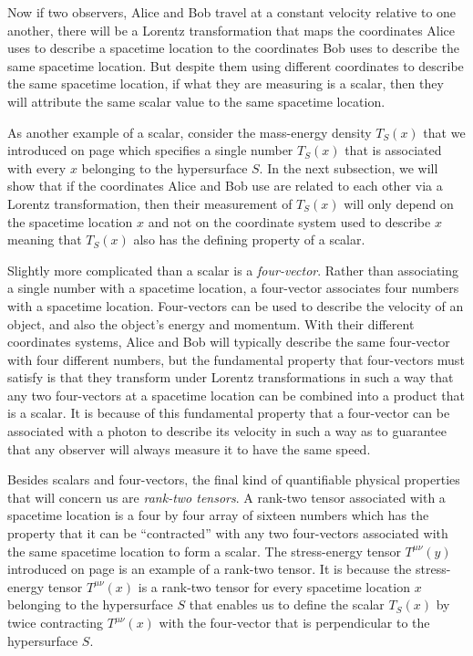 \documentclass[12pt]{report}
\begin{document}
Now if two observers, Alice and Bob travel at a constant velocity relative to one another, there will be a Lorentz transformation that maps the coordinates Alice uses to describe a spacetime location to the coordinates  Bob uses to describe the same spacetime location.  But despite them using different coordinates to describe the same spacetime location, if what they are measuring is a scalar, then they will attribute the same scalar value to the same spacetime location.

As another example of a scalar, consider the mass-energy density $T_S(x)$ that we introduced on page \pageref{massenergydensity} which specifies a single number $T_S(x)$ that is associated with every $x$ belonging to the hypersurface $S$. In the next subsection, we will show that if the coordinates Alice and Bob use are related to each other via a Lorentz transformation, then their measurement of $T_S(x)$ will only depend on the spacetime location $x$ and not on the coordinate system used to describe $x$ meaning that $T_S(x)$ also has the defining property of a scalar.

Slightly more complicated than a scalar is a \emph{four-vector}. Rather than associating a single number with a spacetime location, a four-vector associates four numbers with a spacetime location. Four-vectors can be used to describe the velocity of an object, and also the object's energy and momentum. With their different coordinates systems, Alice and Bob will typically describe the same four-vector with four different numbers, but the fundamental property that four-vectors must satisfy is that they transform under Lorentz transformations in such a way that any two four-vectors at a spacetime location can be combined into a product that is a scalar. It is because of this fundamental property that a four-vector can be associated with a photon to describe its velocity in such a way as to guarantee that any observer will always measure it to have the same speed.

Besides scalars and four-vectors, the final kind of quantifiable physical properties that will concern us are \emph{rank-two tensors}. A rank-two tensor associated with a spacetime location is a four by four array of sixteen numbers which has the property that it can be ``contracted'' with any two four-vectors associated with the same spacetime location to form a scalar. The stress-energy tensor $T^{\mu\nu}(y)$ introduced on page \pageref{stressenergy} is an example of a rank-two tensor. It is because the stress-energy tensor $T^{\mu\nu}(x)$ is a rank-two tensor for every spacetime location $x$ belonging to the hypersurface $S$ that enables us to define the scalar $T_S(x)$ by twice contracting $T^{\mu\nu}(x)$ with the four-vector that is perpendicular to the hypersurface $S$.
\end{document}
